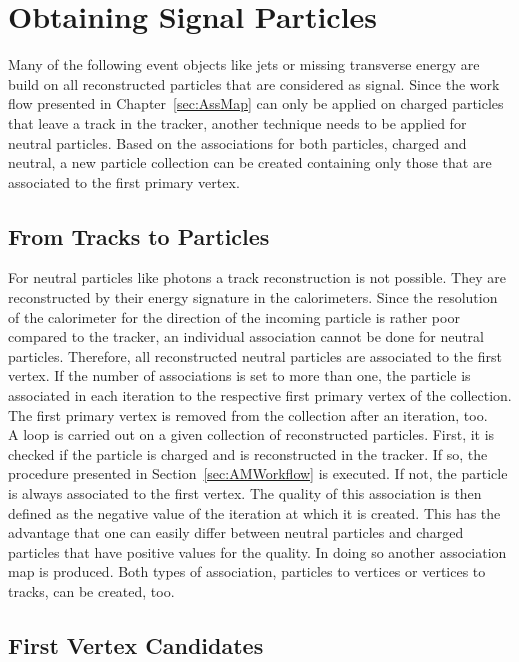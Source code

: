 \chapter{Obtaining Signal Particles \label{sec:OSP} }

Many of the following event objects like jets or missing transverse energy are build on all reconstructed particles that are considered as signal. Since the work flow presented in Chapter~\ref{sec:AssMap} can only be applied on charged particles that leave a track in the tracker, another technique needs to be applied for neutral particles. Based on the associations for both particles, charged and neutral, a new particle collection can be created containing only those that are associated to the first primary vertex.

\section{From Tracks to Particles \label{sec:OSPT2P}}

For neutral particles like photons a track reconstruction is not possible. They are reconstructed by their energy signature in the calorimeters. Since the resolution of the calorimeter for the direction of the incoming particle is rather poor compared to the tracker, an individual association cannot be done for neutral particles. Therefore, all reconstructed neutral particles are associated to the first vertex. If the number of associations is set to more than one, the particle is associated in each iteration to the respective first primary vertex of the collection. The first primary vertex is removed from the collection after an iteration, too. \\
A loop is carried out on a given collection of reconstructed particles. First, it is checked if the particle is charged and is reconstructed in the tracker. If so, the procedure presented in Section~\ref{sec:AMWorkflow} is executed. If not, the particle is always associated to the first vertex. The quality of this association is then defined as the negative value of the iteration at which it is created.  This has the advantage that one can easily differ between neutral particles and charged particles that have positive values for the quality. In doing so another association map is produced. Both types of association, particles to vertices or vertices to tracks, can be created, too.

\section{First Vertex Candidates \label{sec:OSPFVC}}

